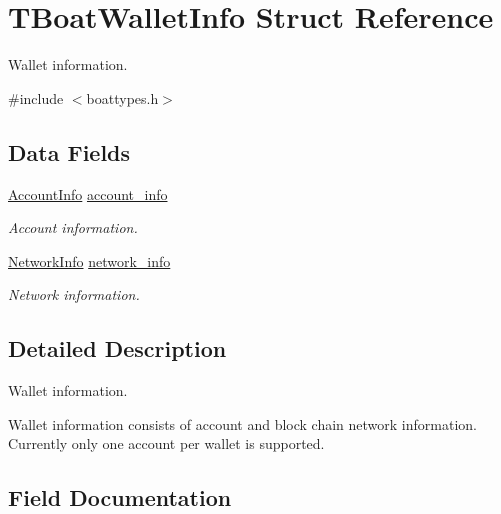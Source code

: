 \hypertarget{struct_t_boat_wallet_info}{}\section{T\+Boat\+Wallet\+Info Struct Reference}
\label{struct_t_boat_wallet_info}


Wallet information.  




{\ttfamily \#include $<$boattypes.\+h$>$}

\subsection*{Data Fields}
\begin{DoxyCompactItemize}
\item 
\mbox{\hyperlink{boattypes_8h_a88968c7beb093674f9b4da03f30b1c21}{Account\+Info}} \mbox{\hyperlink{struct_t_boat_wallet_info_a085f5942a35e11635de0290bc092d89a}{account\+\_\+info}}
\begin{DoxyCompactList}\small\item\em Account information. \end{DoxyCompactList}\item 
\mbox{\hyperlink{boattypes_8h_ab4d27316866d80cf2c913e1369f45729}{Network\+Info}} \mbox{\hyperlink{struct_t_boat_wallet_info_a8dd6ac7d1bf4e913c54ff1103cff1218}{network\+\_\+info}}
\begin{DoxyCompactList}\small\item\em Network information. \end{DoxyCompactList}\end{DoxyCompactItemize}


\subsection{Detailed Description}
Wallet information. 

Wallet information consists of account and block chain network information. Currently only one account per wallet is supported. 

\subsection{Field Documentation}
\mbox{\label{struct_t_boat_wallet_info_a085f5942a35e11635de0290bc092d89a}} 
